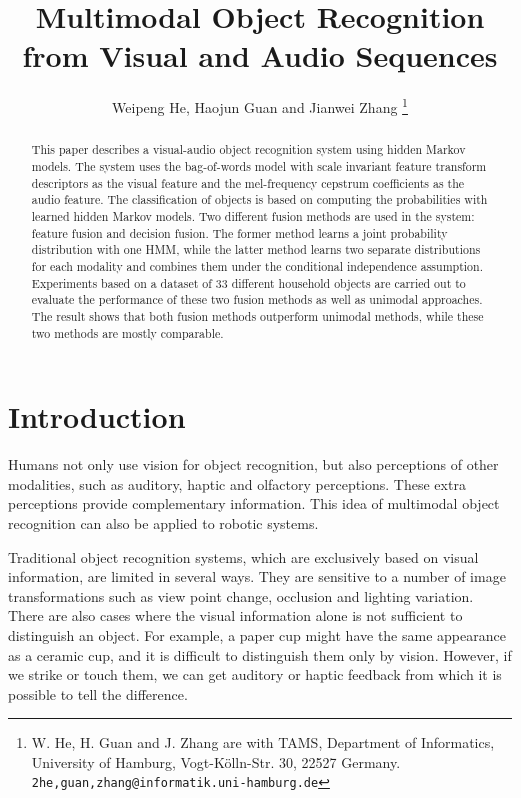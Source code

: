 \documentclass[letterpaper, 10 pt, conference]{ieeeconf}
\title{\LARGE \bf
Multimodal Object Recognition from Visual and Audio Sequences%
}
\author{Weipeng He, Haojun Guan and Jianwei Zhang%
\thanks{W. He, H. Guan and J. Zhang are with TAMS, Department of Informatics, University of Hamburg, Vogt-K\"olln-Str. 30, 22527 Germany. {\tt\small 2he,guan,zhang@informatik.uni-hamburg.de}}%
}
\begin{document}
\maketitle
\thispagestyle{empty}
\pagestyle{empty}

\begin{abstract}
This paper describes a visual-audio object recognition system using hidden Markov models. The system uses the bag-of-words model with scale invariant feature transform descriptors as the visual feature and the mel-frequency cepstrum coefficients as the audio feature. The classification of objects is based on computing the probabilities with learned hidden Markov models. Two different fusion methods are used in the system: feature fusion and decision fusion. The former method learns a joint probability distribution with one HMM, while the latter method learns two separate distributions for each modality and combines them under the conditional independence assumption. Experiments based on a dataset of 33 different household objects are carried out to evaluate the performance of these two fusion methods as well as unimodal approaches. The result shows that both fusion methods outperform unimodal methods, while these two methods are mostly comparable.
\end{abstract}

\section{Introduction}
Humans not only use vision for object recognition, but also perceptions of other modalities, such as auditory, haptic and olfactory perceptions. These extra perceptions provide complementary information. This idea of multimodal object recognition can also be applied to robotic systems.

Traditional object recognition systems, which are exclusively based on visual information, are limited in several ways. They are sensitive to a number of image transformations such as view point change, occlusion and lighting variation. There are also cases where the visual information alone is not sufficient to distinguish an object. For example, a paper cup might have the same appearance as a ceramic cup, and it is difficult to distinguish them only by vision. However, if we strike or touch them, we can get auditory or haptic feedback from which it is possible to tell the difference.
\end{document}
